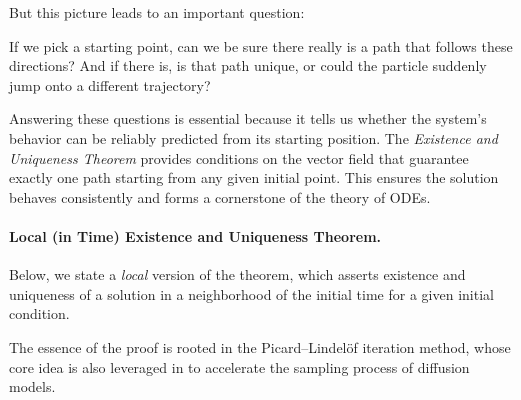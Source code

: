 But this picture leads to an important question: 
\begin{question}
    If we pick a starting point, can we be sure there really is a path that follows these directions? And if there is, is that path unique, or could the particle suddenly jump onto a different trajectory?
\end{question}

Answering these questions is essential because it tells us whether the system’s behavior can be reliably predicted from its starting position.  
The \emph{Existence and Uniqueness Theorem} provides conditions on the vector field that guarantee exactly one path starting from any given initial point.  
This ensures the solution behaves consistently and forms a cornerstone of the theory of ODEs.  


\paragraph{Local (in Time) Existence and Uniqueness Theorem.}


Below, we state a \emph{local} version of the theorem, which asserts existence and uniqueness of a solution in a neighborhood of the initial time for a given initial condition.

The essence of the proof is rooted in the Picard–Lindelöf iteration method, whose core idea is also leveraged in  to accelerate the sampling process of diffusion models.


